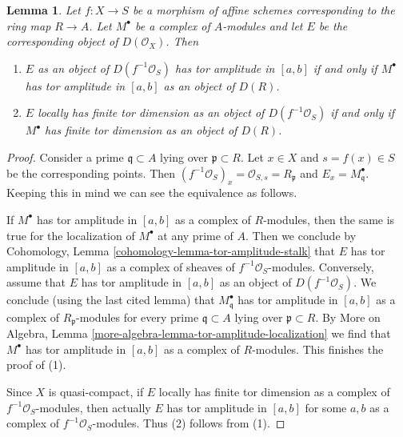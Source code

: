 \documentclass{stacks-project}
\theoremstyle{plain}
\newtheorem{lemma}[subsection]{Lemma}
\theoremstyle{definition}
\theoremstyle{remark}
\numberwithin{equation}{subsection}
\begin{document}
\begin{lemma}
\label{lemma-tor-dimension-rel-affine}
Let $f : X \to S$ be a morphism of affine schemes corresponding
to the ring map $R \to A$. Let $M^\bullet$ be a
complex of $A$-modules and let $E$ be the corresponding object
of $D(\mathcal{O}_X)$. Then
\begin{enumerate}
\item $E$ as an object of $D(f^{-1}\mathcal{O}_S)$ has tor amplitude in
$[a, b]$ if and only if $M^\bullet$ has tor amplitude in $[a, b]$
as an object of $D(R)$.
\item $E$ locally has finite tor dimension as an object of
$D(f^{-1}\mathcal{O}_S)$ if and only if $M^\bullet$
has finite tor dimension as an object of $D(R)$.
\end{enumerate}
\end{lemma}

\begin{proof}
Consider a prime $\mathfrak q \subset A$ lying over $\mathfrak p \subset R$.
Let $x \in X$ and $s = f(x) \in S$ be the corresponding points.
Then $(f^{-1}\mathcal{O}_S)_x = \mathcal{O}_{S, s} = R_\mathfrak p$
and $E_x = M^\bullet_\mathfrak q$. Keeping this in mind we can see
the equivalence as follows.

\medskip\noindent
If $M^\bullet$ has tor amplitude in $[a, b]$ as a complex of $R$-modules,
then the same is true for the localization of $M^\bullet$ at any prime of $A$.
Then we conclude by
Cohomology, Lemma \ref{cohomology-lemma-tor-amplitude-stalk}
that $E$ has tor amplitude in $[a, b]$ as a complex of sheaves
of $f^{-1}\mathcal{O}_S$-modules.
Conversely, assume that $E$ has tor amplitude in $[a, b]$
as an object of $D(f^{-1}\mathcal{O}_S)$.
We conclude (using the last cited lemma) that
$M^\bullet_\mathfrak q$ has tor amplitude in $[a, b]$
as a complex of $R_\mathfrak p$-modules for every
prime $\mathfrak q \subset A$ lying over $\mathfrak p \subset R$.
By More on Algebra, Lemma \ref{more-algebra-lemma-tor-amplitude-localization}
we find that $M^\bullet$ has tor amplitude in $[a, b]$
as a complex of $R$-modules.
This finishes the proof of (1).

\medskip\noindent
Since $X$ is quasi-compact, if $E$ locally has finite tor dimension
as a complex of $f^{-1}\mathcal{O}_S$-modules, then actually $E$
has tor amplitude in $[a, b]$ for some $a, b$ as a complex of
$f^{-1}\mathcal{O}_S$-modules. Thus (2) follows from (1).
\end{proof}
\end{document}
